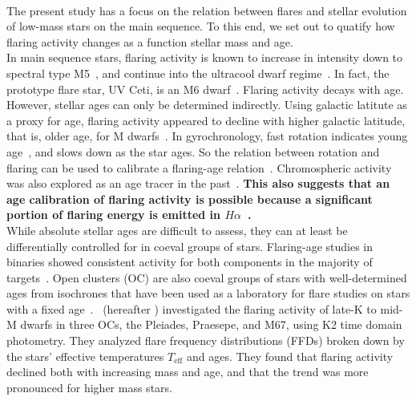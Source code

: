 \documentclass{aa}
\begin{document}
\\
The present study has a focus on the relation between flares and stellar evolution of low-mass stars on the main sequence. To this end, we set out to quatify how flaring activity changes as a function stellar mass and age. 
\\
In main sequence stars, flaring activity is known to increase in intensity down to spectral type M5~\citep{chang2020}, and continue into the ultracool dwarf regime~\citep{schmidt2015, schmidt2016, paudel2018}. In fact, the prototype flare star, UV Ceti, is an M6 dwarf~\citep{kirkpatrick1991}.
Flaring activity decays with age. However, stellar ages can only be determined indirectly. Using galactic latitute as a proxy for age, flaring activity appeared to decline with higher galactic latitude, that is, older age, for M dwarfs~\citep{hilton2010, walkowicz2011, howard2019}. In gyrochronology, fast rotation indicates young age~\citep{barnes_rotational_2003}, and slows down as the star ages. So the relation between rotation and flaring can be used to calibrate a flaring-age relation~\citep{davenport2019}. Chromospheric activity was also explored as an age tracer in the past~\citep{soderblom_chromospheric_1991, pace_chromospheric_2013, lorenzo-oliveira_age-mass-metallicity-activity_2016}.\textbf{ This also suggests that an age calibration of flaring activity is possible because a significant portion of flaring energy is emitted in $H\alpha$~\citep{kowalski2013}.}%
\\
While absolute stellar ages are difficult to assess, they can at least be differentially controlled for in coeval groups of stars. Flaring-age studies in binaries showed consistent activity for both components in the majority of targets~\citep{lurie2015, clarke_flare_2018}. Open clusters (OC) are also coeval groups of stars with well-determined ages from isochrones that have been used as a laboratory for flare studies on stars with a fixed age~\citep{mirzoyan1993, chang2015}. \citet{ilin2019}~(hereafter ) investigated the flaring activity of late-K to mid-M dwarfs in three OCs, the Pleiades, Praesepe, and M67, using K2 time domain photometry. They analyzed flare frequency distributions (FFDs) broken down by the stars' effective temperatures $T_\mathrm{eff}$ and ages. They found that flaring activity declined both with increasing mass and age, and that the trend was more pronounced for higher mass stars. 
\end{document}
